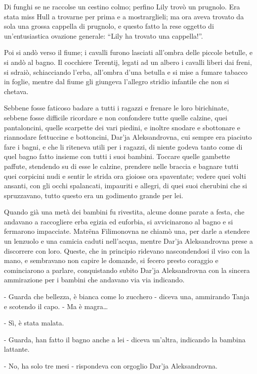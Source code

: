 Di funghi se ne raccolse un cestino colmo; perfino Lily trovò un prugnolo. Era stata miss Hull a trovarne per prima e a mostrarglieli; ma ora aveva trovato da sola una grossa cappella di prugnolo, e questo fatto la rese oggetto di un'entusiastica ovazione generale: ``Lily ha trovato una cappella!''. 

Poi si andò verso il fiume; i cavalli furono lasciati all'ombra delle piccole betulle, e si andò al bagno. Il cocchiere Terentij, legati ad un albero i cavalli liberi dai freni, si sdraiò, schiacciando l'erba, all'ombra d'una betulla e si mise a fumare tabacco in foglie, mentre dal fiume gli giungeva l'allegro stridio infantile che non si chetava. 

Sebbene fosse faticoso badare a tutti i ragazzi e frenare le loro birichinate, sebbene fosse difficile ricordare e non confondere tutte quelle calzine, quei pantaloncini, quelle scarpette dei vari piedini, e inoltre snodare e sbottonare e riannodare fettuccine e bottoncini, Dar'ja Aleksandrovna, cui sempre era piaciuto fare i bagni, e che li riteneva utili per i ragazzi, di niente godeva tanto come di quel bagno fatto insieme con tutti i suoi bambini. Toccare quelle gambette paffute, stendendo su di esse le calzine, prendere nelle braccia e bagnare tutti quei corpicini nudi e sentir le strida ora gioiose ora spaventate; vedere quei volti ansanti, con gli occhi spalancati, impauriti e allegri, di quei suoi cherubini che si spruzzavano, tutto questo era un godimento grande per lei. 

Quando già una metà dei bambini fu rivestita, alcune donne parate a festa, che andavano a raccogliere erba egizia ed euforbia, si avvicinarono al bagno e si fermarono impacciate. Matrëna Filimonovna ne chiamò una, per darle a stendere un lenzuolo e una camicia caduti nell'acqua, mentre Dar'ja Aleksandrovna prese a discorrere con loro. Queste, che in principio ridevano nascondendosi il viso con la mano, e sembravano non capire le domande, si fecero presto coraggio e cominciarono a parlare, conquistando subito Dar'ja Aleksandrovna con la sincera ammirazione per i bambini che andavano via via indicando. 

- Guarda che bellezza, è bianca come lo zucchero - diceva una, ammirando Tanja e scotendo il capo. - Ma è magra\ldots{} 

- Sì, è stata malata. 

- Guarda, han fatto il bagno anche a lei - diceva un'altra, indicando la bambina lattante. 

- No, ha solo tre mesi - rispondeva con orgoglio Dar'ja Aleksandrovna. 

